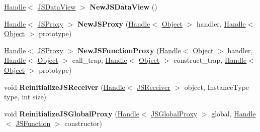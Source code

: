 \begin{DoxyCompactItemize}
\item 
\hypertarget{classv8_1_1internal_1_1_v8___f_i_n_a_l_af3bc8fb445f779aa91df6c6ffc54e73c}{}\hyperlink{classv8_1_1internal_1_1_handle}{Handle}$<$ \hyperlink{classv8_1_1internal_1_1_j_s_data_view}{J\+S\+Data\+View} $>$ {\bfseries New\+J\+S\+Data\+View} ()\label{classv8_1_1internal_1_1_v8___f_i_n_a_l_af3bc8fb445f779aa91df6c6ffc54e73c}

\item 
\hypertarget{classv8_1_1internal_1_1_v8___f_i_n_a_l_a1ae54b9edc956b18744d86b1a7a18610}{}\hyperlink{classv8_1_1internal_1_1_handle}{Handle}$<$ \hyperlink{classv8_1_1internal_1_1_j_s_proxy}{J\+S\+Proxy} $>$ {\bfseries New\+J\+S\+Proxy} (\hyperlink{classv8_1_1internal_1_1_handle}{Handle}$<$ \hyperlink{classv8_1_1internal_1_1_object}{Object} $>$ handler, \hyperlink{classv8_1_1internal_1_1_handle}{Handle}$<$ \hyperlink{classv8_1_1internal_1_1_object}{Object} $>$ prototype)\label{classv8_1_1internal_1_1_v8___f_i_n_a_l_a1ae54b9edc956b18744d86b1a7a18610}

\item 
\hypertarget{classv8_1_1internal_1_1_v8___f_i_n_a_l_a052e0049b38380f4b8dfa67a4c5517d9}{}\hyperlink{classv8_1_1internal_1_1_handle}{Handle}$<$ \hyperlink{classv8_1_1internal_1_1_j_s_proxy}{J\+S\+Proxy} $>$ {\bfseries New\+J\+S\+Function\+Proxy} (\hyperlink{classv8_1_1internal_1_1_handle}{Handle}$<$ \hyperlink{classv8_1_1internal_1_1_object}{Object} $>$ handler, \hyperlink{classv8_1_1internal_1_1_handle}{Handle}$<$ \hyperlink{classv8_1_1internal_1_1_object}{Object} $>$ call\+\_\+trap, \hyperlink{classv8_1_1internal_1_1_handle}{Handle}$<$ \hyperlink{classv8_1_1internal_1_1_object}{Object} $>$ construct\+\_\+trap, \hyperlink{classv8_1_1internal_1_1_handle}{Handle}$<$ \hyperlink{classv8_1_1internal_1_1_object}{Object} $>$ prototype)\label{classv8_1_1internal_1_1_v8___f_i_n_a_l_a052e0049b38380f4b8dfa67a4c5517d9}

\item 
\hypertarget{classv8_1_1internal_1_1_v8___f_i_n_a_l_a3131a4dbf81ef4fbab1c08fb242e0d9a}{}void {\bfseries Reinitialize\+J\+S\+Receiver} (\hyperlink{classv8_1_1internal_1_1_handle}{Handle}$<$ \hyperlink{classv8_1_1internal_1_1_j_s_receiver}{J\+S\+Receiver} $>$ object, Instance\+Type type, int size)\label{classv8_1_1internal_1_1_v8___f_i_n_a_l_a3131a4dbf81ef4fbab1c08fb242e0d9a}

\item 
\hypertarget{classv8_1_1internal_1_1_v8___f_i_n_a_l_ac361c72caccc9e9e6d13c0c783943331}{}void {\bfseries Reinitialize\+J\+S\+Global\+Proxy} (\hyperlink{classv8_1_1internal_1_1_handle}{Handle}$<$ \hyperlink{classv8_1_1internal_1_1_j_s_global_proxy}{J\+S\+Global\+Proxy} $>$ global, \hyperlink{classv8_1_1internal_1_1_handle}{Handle}$<$ \hyperlink{classv8_1_1internal_1_1_j_s_function}{J\+S\+Function} $>$ constructor)\label{classv8_1_1internal_1_1_v8___f_i_n_a_l_ac361c72caccc9e9e6d13c0c783943331}


\end{DoxyCompactItemize}
